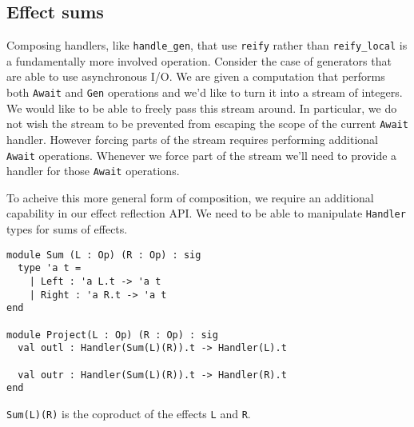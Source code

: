 \documentclass[acmsmall, screen, nonacm]{acmart}
\theoremstyle{definition}
\begin{document}
\subsection{Effect sums}

Composing handlers, like \lstinline[style=oxcaml]{handle_gen}, that use
\lstinline[style=oxcaml]{reify} rather than
\lstinline[style=oxcaml]{reify_local} is a fundamentally more involved
operation. Consider the case of generators that are able to use
asynchronous I/O. We are given a computation that performs both
\lstinline[style=oxcaml]{Await} and \lstinline[style=oxcaml]{Gen}
operations and we'd like to turn it into a stream of integers.  We would
like to be able to freely pass this stream around. In particular, we do
not wish the stream to be prevented from escaping the scope of the
current \lstinline[style=oxcaml]{Await} handler.  However forcing parts
of the stream requires performing additional
\lstinline[style=oxcaml]{Await} operations. Whenever we force part of the
stream we'll need to provide a handler for those
\lstinline[style=oxcaml]{Await} operations.

To acheive this more general form of composition, we require an
additional capability in our effect reflection API. We need to be able
to manipulate \lstinline[style=oxcaml]{Handler} types for sums of
effects.
\begin{lstlisting}[style=oxcaml]
module Sum (L : Op) (R : Op) : sig
  type 'a t =
    | Left : 'a L.t -> 'a t
    | Right : 'a R.t -> 'a t
end

module Project(L : Op) (R : Op) : sig
  val outl : Handler(Sum(L)(R)).t -> Handler(L).t

  val outr : Handler(Sum(L)(R)).t -> Handler(R).t
end
\end{lstlisting}

\lstinline[style=oxcaml]{Sum(L)(R)} is the coproduct of the effects
\lstinline[style=oxcaml]{L} and \lstinline[style=oxcaml]{R}.
\end{document}
